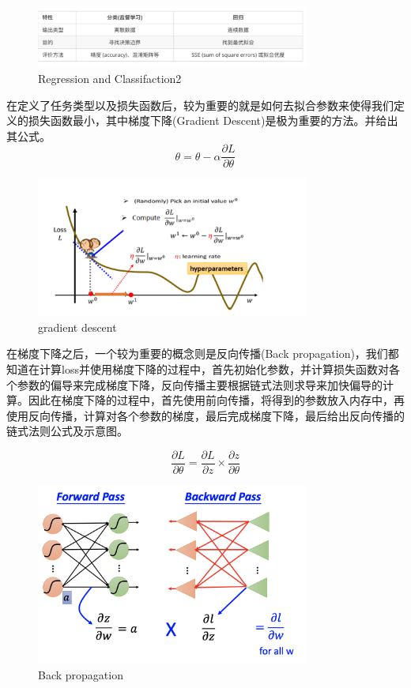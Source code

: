\documentclass{article}
\begin{document}
\begin{figure}[H]
    \centering
    \includegraphics[width=9cm]{picture/RnC.png}
    \caption{Regression and Classifaction2}
    \label{fig:galaxy}
\end{figure}
\indent 在定义了任务类型以及损失函数后，较为重要的就是如何去拟合参数来使得我们定义的损失函数最小，其中梯度下降(Gradient Descent)是极为重要的方法。并给出其公式。
\begin{equation}
    \theta = \theta - \alpha \frac{\partial L}{\partial \theta}
\end{equation}

\begin{figure}[H]
    \centering
    \includegraphics[width=9cm]{picture/grd.png}
    \caption{gradient descent}
    \label{fig:galxy}
\end{figure}
\indent 在梯度下降之后，一个较为重要的概念则是反向传播(Back propagation)，我们都知道在计算loss并使用梯度下降的过程中，首先初始化参数，并计算损失函数对各个参数的偏导来完成梯度下降，反向传播主要根据链式法则求导来加快偏导的计算。因此在梯度下降的过程中，首先使用前向传播，将得到的参数放入内存中，再使用反向传播，计算对各个参数的梯度，最后完成梯度下降，最后给出反向传播的链式法则公式及示意图。

\begin{equation}
    \frac{\partial L}{\partial \theta} = \frac{\partial L}{\partial z} \times \frac{\partial z}{\partial \theta}
\end{equation}

\begin{figure}[H]
    \centering
    \includegraphics[width=9cm]{picture/Back.png}
    \caption{Back propagation}
    \label{fig:galxy}
\end{figure}
\end{document}
